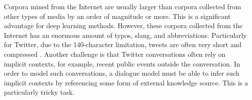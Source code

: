 \documentclass[bsc,frontabs,twoside,singlespacing,parskip,deptreport]{infthesis}     %
\begin{document}
Corpora mined from the Internet are usually larger than corpora collected from other types of media by an order of magnitude or more. This is a significant advantage for deep learning methods. However, these corpora collected from the Internet has an enormous amount of typos, slang, and abbreviations. Particularly for Twitter, due to the 140-character limitation, tweets are often very short and compressed \cite{serban2018survey}. Another challenge is that Twitter conversations often rely on implicit contexts, for example, recent public events outside the conversation. In order to model such conversations, a dialogue model must be able to infer such implicit contexts by referencing some form of external knowledge source. This is a particularly tricky task.


\end{document}
